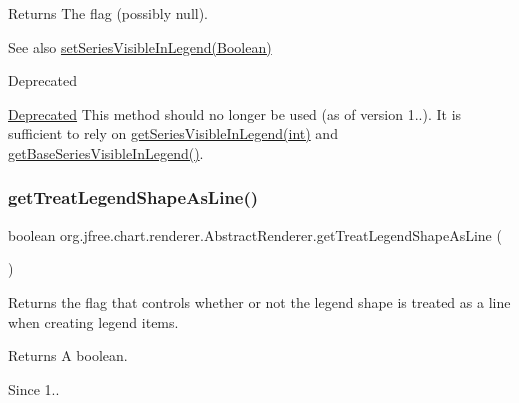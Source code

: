 \begin{DoxyReturn}{Returns}
The flag (possibly {\ttfamily null}).
\end{DoxyReturn}
\begin{DoxySeeAlso}{See also}
\mbox{\hyperlink{classorg_1_1jfree_1_1chart_1_1renderer_1_1_abstract_renderer_a8c0dfdb91884e49115d07e762d2d2594}{set\+Series\+Visible\+In\+Legend(\+Boolean)}}
\end{DoxySeeAlso}
\begin{DoxyRefDesc}{Deprecated}
\item[\mbox{\hyperlink{deprecated__deprecated000113}{Deprecated}}]This method should no longer be used (as of version 1..). It is sufficient to rely on \mbox{\hyperlink{classorg_1_1jfree_1_1chart_1_1renderer_1_1_abstract_renderer_aad277f984aba334ec761085b48ace9f5}{get\+Series\+Visible\+In\+Legend(int)}} and \mbox{\hyperlink{classorg_1_1jfree_1_1chart_1_1renderer_1_1_abstract_renderer_a5657ff754b9ff9dc13bac6349ab43012}{get\+Base\+Series\+Visible\+In\+Legend()}}. \end{DoxyRefDesc}
\mbox{\label{classorg_1_1jfree_1_1chart_1_1renderer_1_1_abstract_renderer_a29745da1503b3fb64e1f6aafbfd4c5e3}} 
\subsubsection{\texorpdfstring{get\+Treat\+Legend\+Shape\+As\+Line()}{getTreatLegendShapeAsLine()}}
{\footnotesize\ttfamily boolean org.\+jfree.\+chart.\+renderer.\+Abstract\+Renderer.\+get\+Treat\+Legend\+Shape\+As\+Line (\begin{DoxyParamCaption}{ }\end{DoxyParamCaption})\hspace{0.3cm}{\ttfamily [protected]}}

Returns the flag that controls whether or not the legend shape is treated as a line when creating legend items.

\begin{DoxyReturn}{Returns}
A boolean.
\end{DoxyReturn}
\begin{DoxySince}{Since}
1.. 
\end{DoxySince}
\mbox{\label{classorg_1_1jfree_1_1chart_1_1renderer_1_1_abstract_renderer_af4423ec60e43c61a87f2657ab28228f0}} 
